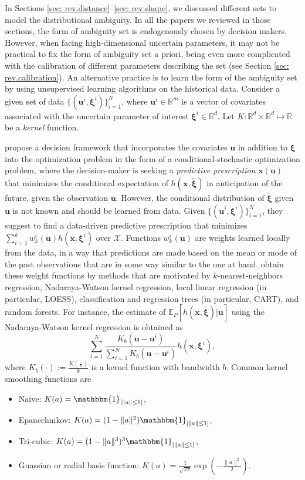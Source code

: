 \documentclass[final,onefignum,onetabnum]{class}
\newcommand{\ee}[2]{\mathbb{E}_{#1} \left[ #2 \right]}
\newcommand{\bs}[1]{\boldsymbol{#1}} %
\newcommand{\Bs}[1]{\mathbb{#1}} %
\newcommand{\Cs}[1]{\mathcal{#1}} %
\newcommand{\txi}{\tilde{\bs{\xi}}}
\begin{document}
In Sections \ref{sec: rev.distance}--\ref{sec: rev.shape}, we discussed different sets to model the distributional ambiguity. In all the papers we reviewed in those sections, the form of  ambiguity set is endogenously chosen by decision makers. However, when facing high-dimensional uncertain parameters, it may not be practical to fix the form of  ambiguity set a priori, being even more complicated with the calibration of different parameters describing the set (see Section \ref{sec: rev.calibration}).  An alternative practice is to learn the form of the ambiguity set by using  unsupervised learning algorithms  on the historical data. 
Consider a given set of data $\{(\bs{u}^{i},\bs{\xi}^{i})\}_{i=1}^{N}$, where $\bs{u}^{i} \in \Bs{R}^{m}$ is a vector of covariates associated with the uncertain parameter of interest $\bs{\xi}^{i} \in \Bs{R}^{d}$. %
Let $K: \Bs{R}^{d} \times \Bs{R}^{d} \mapsto \Bs{R}$ be a {\it kernel} function. %

\citet{bertsimas2018predictive} propose a decision framework that incorporates the covariates $\bs{u}$  in addition to $\bs{\xi}$ into the optimization problem in the form of a conditional-stochastic optimization problem, where the decision-maker is seeking a {\it predictive prescription} $\bs{x}(\bs{u})$ that minimizes the conditional expectation of $h(\bs{x},\txi)$ in anticipation of the future, given the observation $\bs{u}$. However, the conditional distribution of $\txi$ given $\bs{u}$ is not known and should be learned from data. Given $\{(\bs{u}^{i}, \bs{\xi}^{i})\}_{i=1}^{N}$, they suggest to find a data-driven predictive prescription that minimizes $\sum_{i=1}^{k} w_{k}^{i}(\bs{u}) h(\bs{x}, \bs{\xi}^{i})$ over $\Cs{X}$. Functions $w_{k}^{i}(\bs{u})$ are weights  learned locally  from the data, in a way that predictions are made based on the mean or mode of the past observations that are in some way similar to the one at hand. \citet{bertsimas2018predictive}  obtain these weight functions  by methods that are motivated by  $k$-nearest-neighbors regression, Nadaraya-Watson kernel regression, local linear regression (in particular, LOESS), classification and regression trees (in particular, CART), and random forests. 
For instance, the estimate of  $\ee{P}{h(\bs{x}, \txi)\Big|\bs{u}}$ using the  Nadaraya-Watson kernel regression is obtained as 
$$
\sum_{i=1}^{N} \frac{K_{b}(\bs{u}-\bs{u}^{i})}{\sum_{i=1}^{N} K_{b}(\bs{u}-\bs{u}^{i})} h(\bs{x}, \bs{\xi}^{i}),
$$
where $K_{b}(\cdot):=\frac{K(\frac{\cdot}{b})}{b}$ is a kernel function with bandwidth $b$. Common kernel smoothing functions are 
\begin{itemize}
    \item Naive: $K(a)= \mathbbm{1}_{[\|a\| \le 1]}$,
    \item Epanechnikov: $K(a)=(1- \|a\|^{2}) \mathbbm{1}_{[\|a\| \le 1]}$,
    \item Tri-cubic: $K(a)=(1- \|a\|^{3})^{3} \mathbbm{1}_{[\|a\| \le 1]}$,
    \item Guassian or radial basis function: $K(a)=\frac{1}{\sqrt{2\pi}} \exp(- \frac{\|a\|^{2}}{2} )$.
\end{itemize} 
\end{document}
